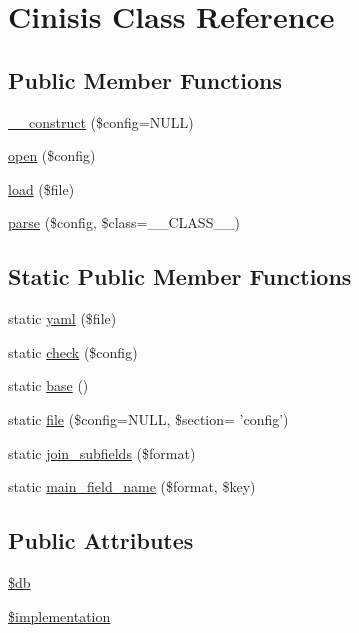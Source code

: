 \hypertarget{classCinisis}{
\section{Cinisis Class Reference}
\label{classCinisis}
}
\subsection*{Public Member Functions}
\begin{DoxyCompactItemize}
\item 
\hyperlink{classCinisis_ab9cb7a94d6a5dfb13d50e83e58a4cc10}{\_\-\_\-construct} (\$config=NULL)
\item 
\hyperlink{classCinisis_ad5ebe493037aad5a2d8a2f6c51fab09f}{open} (\$config)
\item 
\hyperlink{classCinisis_a0bd044303b01793f1a59c54040ff0242}{load} (\$file)
\item 
\hyperlink{classCinisis_ae8d2f767bfb149031b1ac7077c45c7d6}{parse} (\$config, \$class=\_\-\_\-CLASS\_\-\_\-)
\end{DoxyCompactItemize}
\subsection*{Static Public Member Functions}
\begin{DoxyCompactItemize}
\item 
static \hyperlink{classCinisis_add6ffac62cffb6ba5e5b0bec552b2cee}{yaml} (\$file)
\item 
static \hyperlink{classCinisis_ae6f679192f136ba61e85130ccab8e7ef}{check} (\$config)
\item 
static \hyperlink{classCinisis_a125ecd4426e15e2c27daa16d4aaac3f2}{base} ()
\item 
static \hyperlink{classCinisis_aac686f5d4862085721eb0de1d6203a57}{file} (\$config=NULL, \$section= 'config')
\item 
static \hyperlink{classCinisis_a0163d3358b31657bd6e91f94aa618918}{join\_\-subfields} (\$format)
\item 
static \hyperlink{classCinisis_ac470ab9dc1f8c02545708f1c7b820d9e}{main\_\-field\_\-name} (\$format, \$key)
\end{DoxyCompactItemize}
\subsection*{Public Attributes}
\begin{DoxyCompactItemize}
\item 
\hyperlink{classCinisis_ae8aedec88384439c95da89f423a219c0}{\$db}
\item 
\hyperlink{classCinisis_ae537c5305e84e86ae7dd305d2cd253fc}{\$implementation}
\end{DoxyCompactItemize}


